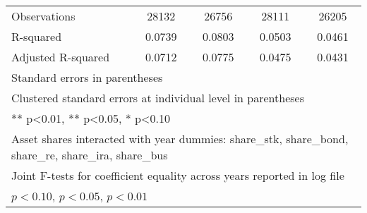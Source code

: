 \begin{table}[htbp]
\begin{tabular}{l*{4}{c}}
Observations    &    28132         &    26756         &    28111         &    26205         \\
R-squared       &   0.0739         &   0.0803         &   0.0503         &   0.0461         \\
Adjusted R-squared&   0.0712         &   0.0775         &   0.0475         &   0.0431         \\
\bottomrule
\multicolumn{5}{l}{\footnotesize Standard errors in parentheses}\\
\multicolumn{5}{l}{\footnotesize Clustered standard errors at individual level in parentheses}\\
\multicolumn{5}{l}{\footnotesize *** p<0.01, ** p<0.05, * p<0.10}\\
\multicolumn{5}{l}{\footnotesize Asset shares interacted with year dummies: share\_stk, share\_bond, share\_re, share\_ira, share\_bus}\\
\multicolumn{5}{l}{\footnotesize Joint F-tests for coefficient equality across years reported in log file}\\
\multicolumn{5}{l}{\footnotesize \sym{*} \(p<0.10\), \sym{**} \(p<0.05\), \sym{***} \(p<0.01\)}\\
\end{tabular}
\end{table}
